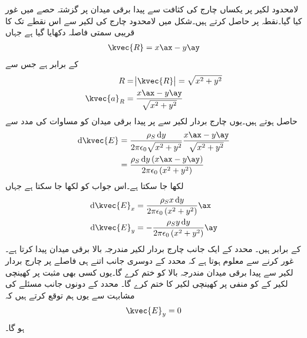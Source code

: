 لامحدود لکیر پر یکساں چارج کی کثافت سے پیدا برقی میدان پر گزشتہ حصے میں غور کیا گیا۔نقطہ   پر  حاصل کرتے ہیں۔شکل میں لامحدود چارج کی لکیر سے اس نقطے تک کا قریبی سمتی فاصلہ  دکھایا گیا ہے جہاں
\begin{align}
\kvec{R}=x \ax-y\ay
\end{align}
کے برابر ہے جس سے
\begin{gather}
\begin{aligned}
R&=\abs{\kvec{R}}=\sqrt{x^2+y^2}\\
\kvec{a}_R&=\frac{x\ax-y\ay}{\sqrt{x^2+y^2}}
\end{aligned}
\end{gather}
حاصل ہوتے ہیں۔یوں چارج بردار لکیر سے  پر پیدا برقی میدان کو مساوات   کی مدد سے
\begin{gather}
\begin{aligned}
\dif \kvec{E} &= \frac{\rho_S \dif y}{2 \pi \epsilon_0 \sqrt{x^2+y^2}} \frac{x\ax-y\ay}{\sqrt{x^2+y^2}}\\
&=\frac{\rho_S \dif y \left(x\ax-y\ay \right)}{2 \pi \epsilon_0 \left(x^2+y^2\right)}
\end{aligned}
\end{gather}
لکھا جا سکتا ہے۔اس جواب کو  لکھا جا سکتا ہے جہاں
\begin{gather}\label{مساوات_کولومب_لامحدود_سطح_کی_میدان_کے_اجزاء}
\begin{aligned}
\dif \kvec{E}_x&=\frac{\rho_S x \dif y }{2 \pi \epsilon_0 \left(x^2+y^2\right)}\ax\\
\dif \kvec{E}_y&=-\frac{\rho_S y\dif y }{2 \pi \epsilon_0 \left(x^2+y^2\right)} \ay
\end{aligned}
\end{gather}
کے برابر ہیں۔ محدد کے ایک جانب چارج بردار لکیر مندرجہ بالا برقی میدان پیدا کرتا ہے۔غور کرنے سے معلوم ہوتا ہے کہ  محدد کے دوسری جانب اتنے ہی فاصلے پر چارج بردار لکیر سے پیدا برقی میدان مندرجہ بالا  کو ختم کرے گا۔یوں کسی بھی مثبت  پر کھینچی لکیر کے   کو منفی  پر کھینچی لکیر کا  ختم کرے گا۔ محدد کے دونوں جانب مسئلے کی مشابہت سے یوں ہم توقع کرتے ہیں کہ
\begin{align}\label{مساوات_کولومب_سطحی_صفر_شدت_حصہ}
\kvec{E}_y=0
\end{align} 
ہو گا۔

